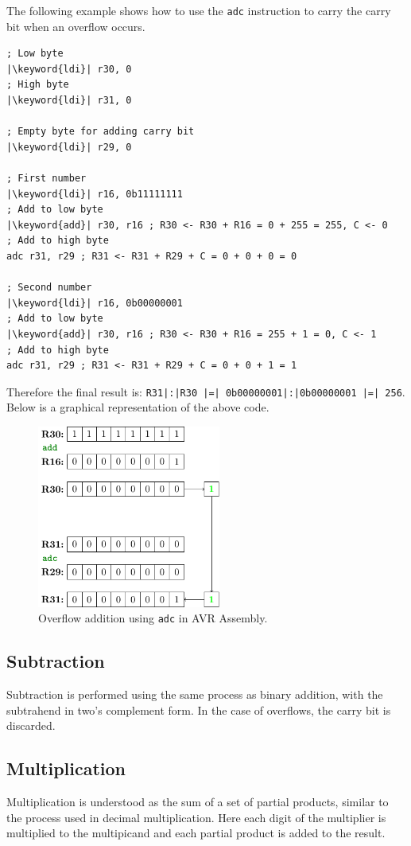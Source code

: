 \documentclass[a4paper]{report}
\newcommand{\keyword}[1]{\textcolor[rgb]{0.00,0.50,0.00}{\textbf{#1}}}
\begin{document}
The following example shows how to use the \texttt{adc} instruction to carry the carry bit when an overflow occurs.
\begin{verbatim}
; Low byte
|\keyword{ldi}| r30, 0
; High byte
|\keyword{ldi}| r31, 0

; Empty byte for adding carry bit
|\keyword{ldi}| r29, 0

; First number
|\keyword{ldi}| r16, 0b11111111
; Add to low byte
|\keyword{add}| r30, r16 ; R30 <- R30 + R16 = 0 + 255 = 255, C <- 0
; Add to high byte
adc r31, r29 ; R31 <- R31 + R29 + C = 0 + 0 + 0 = 0

; Second number
|\keyword{ldi}| r16, 0b00000001
; Add to low byte
|\keyword{add}| r30, r16 ; R30 <- R30 + R16 = 255 + 1 = 0, C <- 1
; Add to high byte
adc r31, r29 ; R31 <- R31 + R29 + C = 0 + 0 + 1 = 1
\end{verbatim}
Therefore the final result is: \texttt{R31|:|R30 |=| 0b00000001|:|0b00000001 |=| 256}.
Below is a graphical representation of the above code.
\begin{figure}[H]
    \centering
    \includegraphics[height = 6cm, keepaspectratio = true]{figures/adc.pdf}
    \caption{Overflow addition using \texttt{adc} in AVR Assembly.} %
\end{figure}
\subsection{Subtraction}
Subtraction is performed using the same process as binary addition, with the
subtrahend in two's complement form.
In the case of overflows, the carry bit is discarded.
\subsection{Multiplication}
Multiplication is understood as the sum of a set of partial products, similar to the process used in decimal multiplication.
Here each digit of the multiplier is multiplied to the multipicand and each partial product is added to the result.
\end{document}

